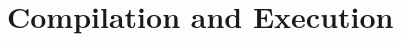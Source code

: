 \documentclass{article}
\begin{document}




\section{Compilation and Execution}
\label{sec:puremd_execute}
\end{document}
